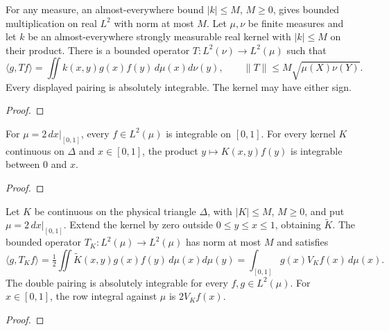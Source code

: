 \begin{supporting}
\begin{theorem}
\label{thm:bounded-kernel-l2}
\leanok
For any measure, an almost-everywhere bound $|k|\le M$, $M\ge0$, gives
bounded multiplication on real $L^2$ with norm at most $M$.
Let $\mu,\nu$ be finite measures and let $k$ be an almost-everywhere strongly
measurable real kernel with $|k|\le M$ on their product. There is a bounded
operator $T:L^2(\nu)\to L^2(\mu)$ such that
\[
 \langle g,Tf\rangle=\iint k(x,y)g(x)f(y)\,d\mu(x)d\nu(y),\qquad
 \|T\|\le M\sqrt{\mu(X)\nu(Y)}.
\]
Every displayed pairing is absolutely integrable. The kernel may have either sign.
\end{theorem}
\begin{proof}
\leanok
\end{proof}

\begin{theorem}
\label{thm:volterra-l2-input}
\leanok
For $\mu=2\,dx|_{[0,1]}$, every $f\in L^2(\mu)$ is integrable on $[0,1]$.
For every kernel $K$ continuous on $\Delta$ and $x\in[0,1]$, the product $y\mapsto K(x,y)f(y)$ is integrable between $0$ and $x$.
\end{theorem}
\begin{proof}
\leanok
\end{proof}
\end{supporting}


\begin{theorem}
\label{thm:volterra-l2}
\leanok
Let $K$ be continuous on the physical triangle $\Delta$, with $|K|\le M$,
$M\ge0$, and put $\mu=2\,dx|_{[0,1]}$. Extend the kernel by zero outside
$0\le y\le x\le1$, obtaining $\widetilde K$. The bounded operator
$T_K:L^2(\mu)\to L^2(\mu)$ has norm at most $M$ and satisfies
\[
 \langle g,T_Kf\rangle
 =\tfrac12\iint\widetilde K(x,y)g(x)f(y)\,d\mu(x)d\mu(y)
 =\int_{[0,1]} g(x)V_Kf(x)\,d\mu(x).
\]
The double pairing is absolutely integrable for every $f,g\in L^2(\mu)$.
For $x\in[0,1]$, the row integral against $\mu$ is $2V_Kf(x)$.
\end{theorem}
\begin{proof}
\leanok
\end{proof}

